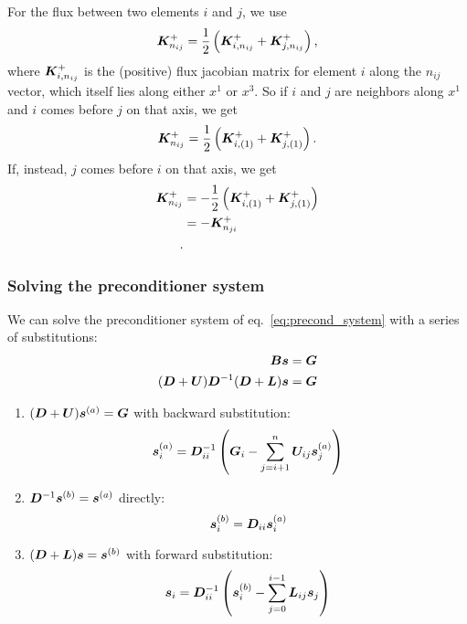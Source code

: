 \documentclass{article}
\begin{document}
For the flux between two elements $i$ and $j$, we use
\begin{equation}
    \bm{K}^+_{n_{ij}} = \dfrac{1}{2}\left(\bm{K}^+_{i,n_{ij}} + \bm{K}^+_{j,n_{ij}}\right)
    \text{,}
\end{equation}
where $\bm{K}^+_{i,n_{ij}}$ is the (positive) flux jacobian matrix for element $i$ along the $n_{ij}$ vector, which itself lies along either $x^1$ or $x^3$. So if $i$ and $j$ are neighbors along $x^1$ and $i$ comes before $j$ on that axis, we get
\begin{equation}
    \bm{K}^+_{n_{ij}} = \dfrac{1}{2}\left(\bm{K}^+_{i,(1)} + \bm{K}^+_{j,(1)}\right)
    \text{.}
\end{equation}
If, instead, $j$ comes before $i$ on that axis, we get
\begin{align}
    \bm{K}^+_{n_{ij}} &= -\dfrac{1}{2}\left(\bm{K}^+_{i,(1)} + \bm{K}^+_{j,(1)}\right) \\
                        &= -\bm{K}^+_{n_{ji}} \\
    \text{.}
\end{align}

\subsubsection{Solving the preconditioner system}

We can solve the preconditioner system of eq.~\ref{eq:precond_system} with a series of 
substitutions:
\begin{align}
    \bm{B} \bm{s} &= \bm{G} \\
    (\bm{D} + \bm{U}) \bm{D}^{-1} (\bm{D} + \bm{L}) \bm{s} &= \bm{G}
\end{align}

\begin{enumerate}
    \item $(\bm{D} + \bm{U}) \bm{s}^{(a)} = \bm{G}$ with backward substitution:
        \begin{equation}
            \bm{s}^{(a)}_i =
             \bm{D}^{-1}_{ii} \left(\bm{G}_i - \sum_{j=i+1}^n \bm{U}_{ij}\bm{s}^{(a)}_j \right) \label{eq:backward_step}
        \end{equation}
    \item $\bm{D}^{-1} \bm{s}^{(b)} = \bm{s}^{(a)}$ directly:
        \begin{equation}
            \bm{s}^{(b)}_i = \bm{D}_{ii}\bm{s}^{(a)}_i
        \end{equation}
    \item $(\bm{D} + \bm{L}) \bm{s} = \bm{s}^{(b)}$ with forward substitution:
        \begin{equation}
            \bm{s}_i = \bm{D}^{-1}_{ii} \left(
                \bm{s}^{(b)}_i - \sum_{j=0}^{i-1} \bm{L}_{ij} \bm{s}_j
                \right)
        \end{equation}
\end{enumerate}
\end{document}

